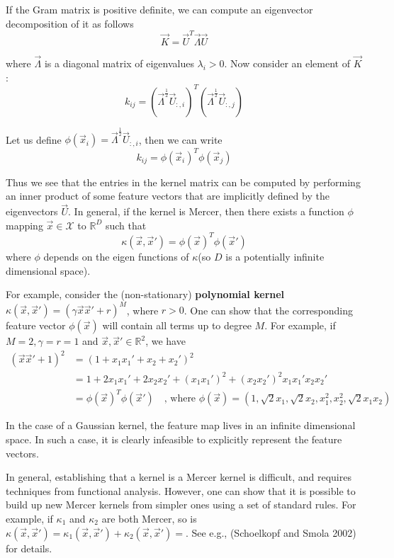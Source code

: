 If the Gram matrix is positive definite, we can compute an eigenvector decomposition of it as follows
\begin{equation}
\vec{K}=\vec{U}^T\vec{\Lambda}\vec{U}
\end{equation}

where $\vec{\Lambda}$ is a diagonal matrix of eigenvalues $\lambda_i >0$. Now consider an element of $\vec{K}$:
\begin{equation}
k_{ij}=(\vec{\Lambda}^{\frac{1}{2}}\vec{U}_{:,i})^T(\vec{\Lambda}^{\frac{1}{2}}\vec{U}_{:,j})
\end{equation}

Let us define $\phi(\vec{x}_i)=\vec{\Lambda}^{\frac{1}{2}}\vec{U}_{:,i}$, then we can write
\begin{equation}
k_{ij}=\phi(\vec{x}_i)^T\phi(\vec{x}_j)
\end{equation}

Thus we see that the entries in the kernel matrix can be computed by performing an inner product of some feature vectors that are implicitly defined by the eigenvectors $\vec{U}$. In general, if the kernel is Mercer, then there exists a function $\phi$ mapping $\vec{x} \in \mathcal{X}$ to $\mathbb{R}^D$ such that
\begin{equation}
\kappa(\vec{x},\vec{x}')=\phi(\vec{x})^T\phi(\vec{x}')
\end{equation}
where $\phi$ depends on the eigen functions of $\kappa$(so $D$ is a potentially infinite dimensional space).

For example, consider the (non-stationary) \textbf{polynomial kernel} $\kappa(\vec{x},\vec{x}')=(\gamma \vec{x}\vec{x}'+r)^M$, where $r>0$. One can show that the corresponding feature vector $\phi(\vec{x})$ will contain all terms up to degree $M$. For example, if $M=2, \gamma=r=1$ and $\vec{x}, \vec{x}' \in \mathbb{R}^2$, we have
\begin{align*}
(\vec{x}\vec{x}'+1)^2 & =(1+x_1x_1'+x_2+x_2')^2 \\
    & = 1+2x_1x_1'+2x_2x_2'+(x_1x_1')^2+(x_2x_2')^2x_1x_1'x_2x_2' \\
	& = \phi(\vec{x})^T\phi(\vec{x}') \quad \text{, where } \phi(\vec{x})=(1,\sqrt{2}x_1,\sqrt{2}x_2,x_1^2,x_2^2,\sqrt{2}x_1x_2)
\end{align*}

In the case of a Gaussian kernel, the feature map lives in an infinite dimensional space. In such a case, it is clearly infeasible to explicitly represent the feature vectors.

In general, establishing that a kernel is a Mercer kernel is difficult, and requires techniques from functional analysis. However, one can show that it is possible to build up new Mercer kernels from simpler ones using a set of standard rules. For example, if $\kappa_1$ and $\kappa_2$ are both Mercer, so is $\kappa(\vec{x},\vec{x}')=\kappa_1(\vec{x},\vec{x}')+\kappa_2(\vec{x},\vec{x}')=$. See e.g., (Schoelkopf and Smola 2002) for details.


